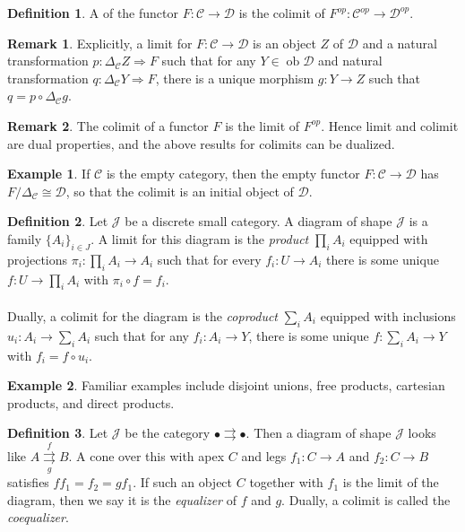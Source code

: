 \documentclass[10pt,letterpaper,cm]{nupset}
\theoremstyle{definition}
\newtheorem*{definition}{Definition}
\newtheorem{exmp}{Example}
\newtheorem{remark}{Remark}
\newcommand{\1}{\mathbf{1}}
\renewcommand{\c}{\mathscr{C}}
\renewcommand{\d}{\mathscr{D}}
\renewcommand{\j}{\mathscr{J}}
\newcommand{\0}{\vec 0}
\DeclareMathOperator{\ob}{ob}
\begin{document}
\begin{definition}
A  of the functor $F: \c \to \d$ is the colimit of $F^{op} : \c^{op} \to \d^{op}$.
\end{definition}

\begin{remark}
Explicitly,  a limit for $F: \c \to \d$ is an object $Z$ of $\d$ and a natural transformation $p: \Delta_{\c}Z \Rightarrow F$ such that for any $Y \in \ob \d$ and natural transformation $q: \Delta_{\c}Y \Rightarrow F$, there is a unique morphism $g: Y \to Z$ such that $ q= p \circ \Delta_{\c}g$.
\end{remark}

\begin{remark}
The colimit of a functor $F$ is the limit of $F^{op}$. Hence limit and colimit are dual properties, and the above results for colimits can be dualized.
\end{remark}

\begin{exmp}
If $\c$ is the empty category, then the empty functor $F: \c \to \d$ has $F/\Delta_{\c}\cong \d$, so that the colimit is an initial object of $\d$.
\end{exmp}

\begin{definition}
Let $\j$ be a discrete small category. A diagram of shape $\j$ is a family $\{A_i\}_{i\in J}$. A limit for this diagram is the \textit{product} $\prod_i A_i$ equipped with projections $\pi_i : \prod_i A_i \to A_i$ such that for every $f_{i} : U \to A_i$ there is some unique $f: U \to \prod_i A_i$ with $\pi_i \circ f = f_i$. 
\\ \\ Dually, a colimit for the diagram is the \textit{coproduct} $\sum_i A_i$ equipped with inclusions $u_i : A_i \to \sum_i A_i$ such that for any $f_i : A_i \to Y$, there is some unique $f : \sum_i A_i \to Y$ with $f_i = f \circ u_i$.
\end{definition}

\begin{exmp}
Familiar examples include disjoint unions, free products, cartesian products, and direct products. 
\end{exmp}

\begin{definition}
Let $\j$ be the category $\bullet \rightrightarrows \bullet$. Then  a diagram of shape $\j$ looks like $A \overset{f}{\underset{g}{\rightrightarrows}} B$. A cone over this with apex $C$ and legs $f_1 : C \to A$ and $f_2 : C \to B$ satisfies $ff_1=f_2 = gf_1$. If such an object $C$ together with $f_1$ is the limit of the diagram, then we say it is the \textit{equalizer} of $f$ and $g$. Dually, a colimit is called the \textit{coequalizer}.
\end{definition}
\end{document}
